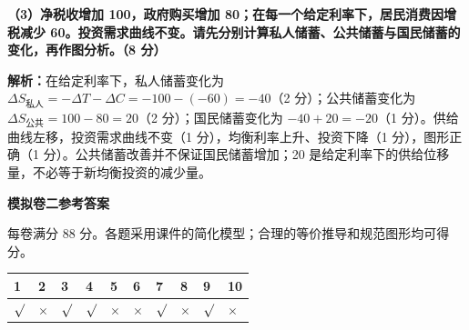 \documentclass[UTF8,11pt,a4paper,fontset=fandol]{ctexart}
\newcommand{\sect}[1]{\par\vspace{0.7em}{\large\bfseries #1}\par\vspace{0.6em}}
\newcommand{\ans}[1]{\par\textbf{解析：}#1\par}
\begin{document}
\textbf{（3）净税收增加 100，政府购买增加 80；在每一个给定利率下，居民消费因增税减少 60。投资需求曲线不变。请先分别计算私人储蓄、公共储蓄与国民储蓄的变化，再作图分析。（8 分）}
\ans{在给定利率下，私人储蓄变化为 $\Delta S_{\text{私人}}=-\Delta T-\Delta C=-100-(-60)=-40$（2 分）；公共储蓄变化为 $\Delta S_{\text{公共}}=100-80=20$（2 分）；国民储蓄变化为 $-40+20=-20$（1 分）。供给曲线左移，投资需求曲线不变（1 分），均衡利率上升、投资下降（1 分），图形正确（1 分）。公共储蓄改善并不保证国民储蓄增加；20 是给定利率下的供给位移量，不必等于新均衡投资的减少量。}
\newpage
{\Large\bfseries 模拟卷二参考答案}\par
\smallskip 每卷满分 88 分。各题采用课件的简化模型；合理的等价推导和规范图形均可得分。
\sect{一、判断题（每题 2 分，共 20 分）}
\par\smallskip\begin{tabularx}{\linewidth}{|*{10}{Y|}}&2&3&4&5&6&7&8&9&10\\\hline
$\surd$&$\times$&$\surd$&$\surd$&$\times$&$\times$&$\surd$&$\times$&$\surd$&$\times$\\\hline
\end{tabularx}\par\smallskip
\end{document}
